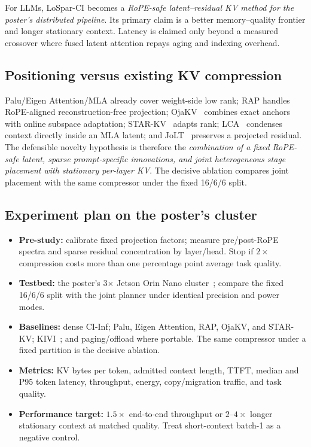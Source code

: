 \documentclass[11pt]{article}
\newcommand{\term}[1]{\textbf{\color{accent!85!black}#1}}
\begin{document}
\begin{claimbox}
For LLMs, LoSpar-CI becomes a \emph{RoPE-safe latent--residual KV method for the poster's
distributed pipeline}. Its primary claim is a better memory--quality frontier and longer
stationary context. Latency is claimed only beyond a measured crossover where fused latent
attention repays aging and indexing overhead.
\end{claimbox}

\subsection{Positioning versus existing KV compression}
Palu/Eigen Attention/MLA already cover weight-side low rank; RAP handles RoPE-aligned
reconstruction-free projection; OjaKV~\cite{ojakv} combines exact anchors with online subspace
adaptation; STAR-KV~\cite{starkv} adapts rank; LCA~\cite{lca} condenses context directly
inside an MLA latent; and JoLT~\cite{jolt} preserves a projected
residual. The defensible novelty hypothesis is therefore the \emph{combination of a fixed
RoPE-safe latent, sparse prompt-specific innovations, and joint heterogeneous stage placement
with stationary per-layer KV}. The decisive ablation compares joint placement with the same
compressor under the fixed 16/6/6 split.

\subsection{Experiment plan on the poster's cluster}
\begin{itemize}[leftmargin=1.5em,itemsep=1pt]
\item \term{Pre-study:} calibrate fixed projection factors; measure pre/post-RoPE spectra
and sparse residual concentration by layer/head. Stop if $2\times$ compression costs more than
one percentage point average task quality.
\item \term{Testbed:} the poster's 3$\times$ Jetson Orin Nano cluster~\cite{poster}; compare
the fixed 16/6/6 split with the joint planner under identical precision and power modes.
\item \term{Baselines:} dense CI-Inf; Palu, Eigen Attention, RAP, OjaKV, and STAR-KV;
KIVI~\cite{kivi}; and paging/offload where portable. The same compressor under a fixed
partition is the decisive ablation.
\item \term{Metrics:} KV bytes per token, admitted context length, TTFT, median and P95
token latency, throughput, energy, copy/migration traffic, and task quality.
\item \term{Performance target:} $1.5\times$ end-to-end throughput or $2$--$4\times$ longer
stationary context at matched quality. Treat short-context batch-1 as a negative control.
\end{itemize}
\end{document}
